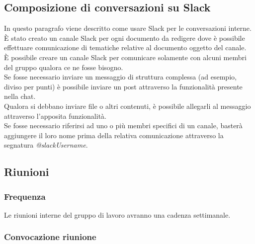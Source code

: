 \documentclass[../NormeDiProgetto.tex]{subfiles}
\begin{document}
			\subsection{Composizione di conversazioni su Slack}
				In questo paragrafo viene descritto come usare Slack per le conversazioni interne.\\
				È stato creato un canale Slack per ogni documento da redigere dove è possibile
				effettuare comunicazione di tematiche relative al documento oggetto del canale.\\
				È possibile creare un canale Slack per comunicare solamente con alcuni membri del
				gruppo qualora ce ne fosse bisogno.\\
				Se fosse necessario inviare un messaggio di struttura complessa (ad esempio, diviso
				per punti) è possibile inviare un post attraverso la funzionalità presente nella chat.\\
				Qualora si debbano inviare file o altri contenuti, è possibile allegarli al messaggio
				attraverso l'apposita funzionalità.\\
				Se fosse necessario riferirsi ad uno o più membri specifici di un canale, basterà
				aggiungere il loro nome prima della relativa comunicazione attraverso la segnatura
				\textit{@slackUsername}.
			\subsection{Riunioni}
				\subsubsection{Frequenza}
					Le riunioni interne del gruppo di lavoro avranno una cadenza settimanale.
				\subsubsection{Convocazione riunione}
\end{document}
